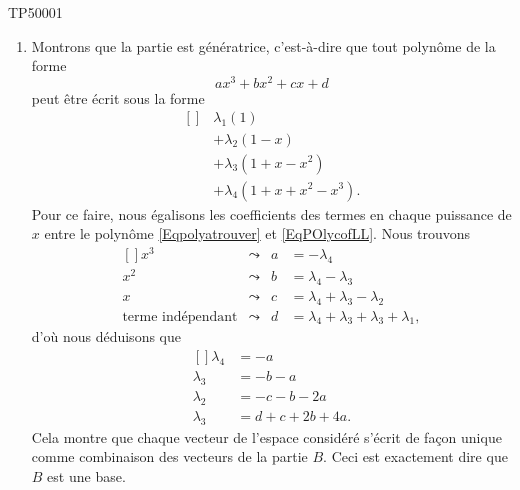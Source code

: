\begin{corrige}{TP50001}

	\begin{enumerate}

		\item
			


	Montrons que la partie est génératrice, c'est-à-dire que tout polynôme de la forme
	\begin{equation}		\label{Eqpolyatrouver}
		ax^3+bx^2+cx+d
	\end{equation}
	peut être écrit sous la forme
	\begin{equation}		\label{EqPOlycofLL}
		\begin{aligned}[]
			&\lambda_1(1)\\
			&+\lambda_2(1-x)\\
			&+\lambda_3(1+x-x^2)\\
			&+\lambda_4(1+x+x^2-x^3).
		\end{aligned}
	\end{equation}
	Pour ce faire, nous égalisons les coefficients des termes en chaque puissance de $x$ entre le polynôme \eqref{Eqpolyatrouver} et \eqref{EqPOlycofLL}. Nous trouvons
	\begin{equation}
		\begin{aligned}[]
			x^3&\leadsto &a&=-\lambda_4\\
			x^2&\leadsto &b&=\lambda_4-\lambda_3\\
			x&\leadsto &c&=\lambda_4+\lambda_3-\lambda_2\\
			\text{terme indépendant}&\leadsto &d&=\lambda_4+\lambda_3+\lambda_3+\lambda_1,
		\end{aligned}
	\end{equation}
	d'où nous déduisons que
	\begin{equation}		\label{EqSolspolyTPc}
		\begin{aligned}[]
			\lambda_4&=-a\\
			\lambda_3&=-b-a\\
			\lambda_2&=-c-b-2a\\
			\lambda_3&=d+c+2b+4a.
		\end{aligned}
	\end{equation}
	Cela montre que chaque vecteur de l'espace considéré s'écrit de façon unique comme combinaison des vecteurs de la partie $B$. Ceci est exactement dire que $B$ est une base.



\end{enumerate}
\end{corrige}
